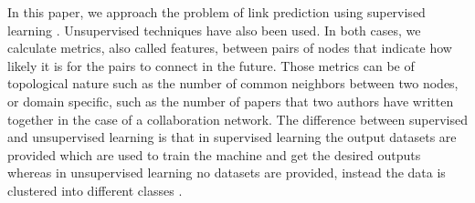 \documentclass{acm_proc_article-sp}
\begin{document}
In this paper, we approach the problem of link prediction using supervised learning \cite{Fire2013, Hasan06linkprediction, Lichtenwalter:2010:NPM:1835804.1835837, Wang:2007:LPM:1441428.1442084}. Unsupervised techniques have also been used. In both cases, we calculate metrics, also called features, between pairs of nodes that indicate how likely it is for the pairs to connect in the future. Those metrics can be of topological nature such as the number of common neighbors between two nodes, or domain specific, such as the number of papers that two authors have written together in the case of a collaboration network. The difference between supervised and unsupervised learning is that in supervised learning the output datasets are provided which are used to train the machine and get the desired outputs whereas in unsupervised learning no datasets are provided, instead the data is clustered into different classes . 





\end{document}
